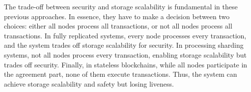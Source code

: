 The trade-off between security and storage scalability is fundamental in these previous approaches.
In essence, they have to make a decision between two choices: either all nodes process all transactions, or not all nodes process all transactions.
In fully replicated systems, every node processes every transaction, and the system trades off storage scalability for security.
In processing sharding systems, not all nodes process every transaction, enabling storage scalability but trades off security.
Finally, in stateless blockchains, while all nodes participate in the agreement part, none of them execute transactions.
Thus, the system can achieve storage scalability and safety but losing liveness.

\fi
